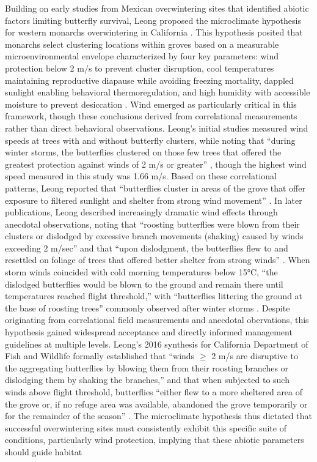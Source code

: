Building on early studies from Mexican overwintering sites that identified abiotic factors limiting butterfly survival, Leong proposed the microclimate hypothesis for western monarchs overwintering in California \parencite{leongMicroenvironmentalFactorsAssociated1990}. This hypothesis posited that monarchs select clustering locations within groves based on a measurable microenvironmental envelope characterized by four key parameters: wind protection below 2 m/s to prevent cluster disruption, cool temperatures maintaining reproductive diapause while avoiding freezing mortality, dappled sunlight enabling behavioral thermoregulation, and high humidity with accessible moisture to prevent desiccation \parencite{leongMicroenvironmentalFactorsAssociated1990,leongUseMultivariateAnalyses1991}. Wind emerged as particularly critical in this framework, though these conclusions derived from correlational measurements rather than direct behavioral observations. Leong's initial studies measured wind speeds at trees with and without butterfly clusters, while noting that ``during winter storms, the butterflies clustered on those few trees that offered the greatest protection against winds of 2 m/s or greater'' \parencite{leongMicroenvironmentalFactorsAssociated1990}, though the highest wind speed measured in this study was 1.66 m/s. Based on these correlational patterns, Leong reported that ``butterflies cluster in areas of the grove that offer exposure to filtered sunlight and shelter from strong wind movement'' \parencite{leongUseMultivariateAnalyses1991}. In later publications, Leong described increasingly dramatic wind effects through anecdotal observations, noting that ``roosting butterflies were blown from their clusters or dislodged by excessive branch movements (shaking) caused by winds exceeding 2 m/sec'' and that ``upon dislodgment, the butterflies flew to and resettled on foliage of trees that offered better shelter from strong winds'' \parencite{leongRestorationOverwinteringGrove1999}. When storm winds coincided with cold morning temperatures below 15°C, ``the dislodged butterflies would be blown to the ground and remain there until temperatures reached flight threshold,'' with ``butterflies littering the ground at the base of roosting trees'' commonly observed after winter storms \parencite{leongRestorationOverwinteringGrove1999}. Despite originating from correlational field measurements and anecdotal obervations, this hypothesis gained widespread acceptance and directly informed management guidelines at multiple levels. Leong's 2016 synthesis for California Department of Fish and Wildlife formally established that ``winds $\geq$ 2 m/s are disruptive to the aggregating butterflies by blowing them from their roosting branches or dislodging them by shaking the branches,'' and that when subjected to such winds above flight threshold, butterflies ``either flew to a more sheltered area of the grove or, if no refuge area was available, abandoned the grove temporarily or for the remainder of the season'' \parencite{leongEvaluationManagementCalifornia2016}. The microclimate hypothesis thus dictated that successful overwintering sites must consistently exhibit this specific suite of conditions, particularly wind protection, implying that these abiotic parameters should guide habitat 